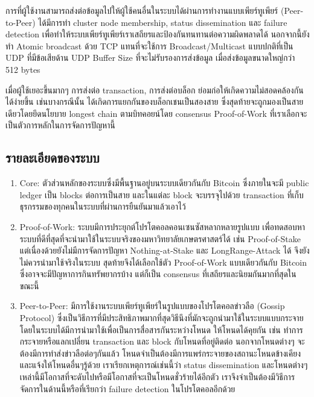 \documentclass[letterpaper, 10pt, conference]{ieeeconf}
\begin{document}
	\par การที่ผู้ใช้งานสามารถส่งต่อข้อมูลไปให้ผู้ใช้คนอื่นในระบบได้ผ่านการทำงานแบบเพียร์ทูเพียร์ (Peer-to-Peer) ได้มีการทำ cluster node membership, status dissemination และ failure detection เพื่อทำให้ระบบเพียร์ทูเพียร์เราเสถียรและป้องกันทนทานต่อความผิดพลาดได้ นอกจากนี้ยังทำ Atomic broadcast ด้วย TCP แทนที่จะใช้การ Broadcast/Multicast แบบปกติที่เป็น UDP ที่มีข้อเสียด้าน UDP Buffer Size ที่จะไม่รับรองการส่งข้อมูล เมื่อส่งข้อมูลขนาดใหญ่กว่า 512 bytes
	\par เมื่อผู้ใช้เยอะขึ้นมากๆ การส่งต่อ transaction, การส่งต่อบล็อก ย่อมก่อให้เกิดความไม่สอดคล้องกันได้ง่ายขึ้น เช่นบางกรณีนั้น ได้เกิดการแยกกันของบล็อกเชนเป็นสองสาย ซึ่งสุดท้ายจะถูกมองเป็นสายเดียวโดยยึดนโยบาย longest chain ตามบิทคอยน์โดย consensus Proof-of-Work ที่เราเลือกจะเป็นตัวการหลักในการจัดการปัญหานี้

\subsection{รายละเอียดของระบบ}
	\begin{enumerate}
		\item Core: ตัวส่วนหลักของระบบซึ่งมีพื้นฐานอยู่บนระบบเดียวกันกับ Bitcoin ซึ่งภายในจะมี public ledger เป็น blocks ต่อการเป็นสาย และในแต่ละ block จะบรรจุไปด้วย transaction ที่เก็บธุรกรรมของทุกคนในระบบที่ผ่านการยืนยันมาแล้วเอาไว้ 
		\item Proof-of-Work: ระบบมีการประยุกต์โปรโตคอลคอนเซนซัสหลากหลายรูปแบบ เพื่อทดสอบหาระบบที่ดีที่สุดที่จะนำมาใช้ในระบบจริงของมหาวิทยาลัยเกษตรศาสตร์ได้ เช่น Proof-of-Stake แต่เนื่องด้วยยังไม่มีการจัดการปัญหา Nothing-at-Stake และ LongRange-Attack ได้ จึงยังไม่ควรนำมาใช้จริงในระบบ สุดท้ายจึงได้เลือกใช้ตัว Proof-of-Work แบบเดียวกันกับ Bitcoin ซึ่งอาจจะมีปัญหาการกินทรัพยากรบ้าง แต่ก็เป็น consensus ที่เสถียรและนิยมกันมากที่สุดในขณะนี้
		\item Peer-to-Peer: มีการใช้งานระบบเพียร์ทูเพียร์ในรูปแบบของโปรโตคอลข่าวลือ (Gossip Protocol) ซึ่งเป็นวิธีการที่มีประสิทธิภาพมากที่สุดวิธีนึงที่มักจะถูกนำมาใช้ในระบบแบบกระจาย โดยในระบบได้มีการนำมาใช้เพื่อเป็นการสื่อสารกันระหว่างโหนด ให้โหนดได้คุยกัน เช่น ทำการกระจายหรือแลกเปลี่ยน transaction และ block กับโหนดที่อยู่ติดต่อ นอกจากโหนดต่างๆ จะต้องมีการทำส่งข่าวลือต่อๆกันแล้ว โหนดจำเป็นต้องมีการแพร่กระจายของสถานะโหนดข้างเคียงและแจ้งให้โหนดอื่นๆรู้ด้วย เราเรียกเหตุการณ์เช่นนี้ว่า status dissemination และโหนดต่างๆเหล่านี้มีโอกาสที่จะดับไปหรือมีโอกาสที่จะเป็นโหนดชั่วร้ายได้อีกตัว เราจึงจำเป็นต้องมีวิธีการจัดการในด้านนี้หรือที่เรียกว่า failure detection ในโปรโตคอลอีกด้วย
	\end{enumerate}
\end{document}
